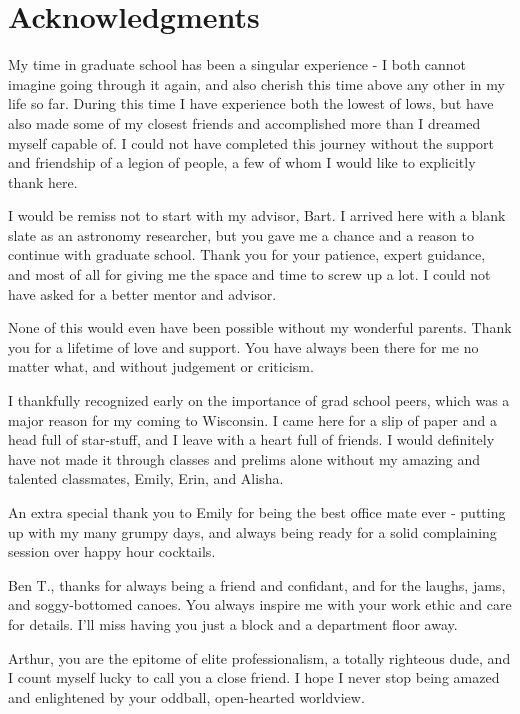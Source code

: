 \chapter*{Acknowledgments}

My time in graduate school has been a singular experience - I both cannot imagine going through it again, and also cherish this time above any other in my life so far. During this time I have experience both the lowest of lows, but have also made some of my closest friends and accomplished more than I dreamed myself capable of. I could not have completed this journey without the support and friendship of a legion of people, a few of whom I would like to explicitly thank here.

I would be remiss not to start with my advisor, Bart. I arrived here with a blank slate as an astronomy researcher, but you gave me a chance and a reason to continue with graduate school. Thank you for your patience, expert guidance, and most of all for giving me the space and time to screw up a lot. I could not have asked for a better mentor and advisor.

None of this would even have been possible without my wonderful parents. Thank you for a lifetime of love and support. You have always been there for me no matter what, and without judgement or criticism.

I thankfully recognized early on the importance of grad school peers, which was a major reason for my coming to Wisconsin. I came here for a slip of paper and a head full of star-stuff, and I leave with a heart full of friends. I would definitely have not made it through classes and prelims alone without my amazing and talented classmates, Emily, Erin, and Alisha.

An extra special thank you to Emily for being the best office mate ever - putting up with my many grumpy days, and always being ready for a solid complaining session over happy hour cocktails. 

Ben T., thanks for always being a friend and confidant, and for the laughs, jams, and soggy-bottomed canoes. You always inspire me with your work ethic and care for details. I'll miss having you just a block and a department floor away. 

Arthur, you are the epitome of elite professionalism, a totally righteous dude, and I count myself lucky to call you a close friend. I hope I never stop being amazed and enlightened by your oddball, open-hearted worldview. 

